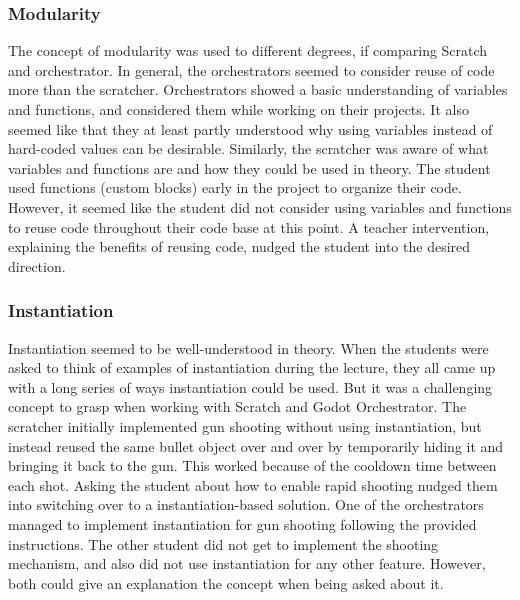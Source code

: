 \subsubsection{Modularity}
The concept of modularity was used to different degrees, if comparing Scratch and orchestrator.
In general, the orchestrators seemed to consider reuse of code more than the scratcher.
Orchestrators showed a basic understanding of variables and functions, and considered them while working on their projects.
It also seemed like that they at least partly understood why using variables instead of hard-coded values can be desirable.
Similarly, the scratcher was aware of what variables and functions are and how they could be used in theory.
The student used functions (custom blocks) early in the project to organize their code.
However, it seemed like the student did not consider using variables and functions to reuse code throughout their code base at this point.
A teacher intervention, explaining the benefits of reusing code, nudged the student into the desired direction.

\subsubsection{Instantiation}
Instantiation seemed to be well-understood in theory.
When the students were asked to think of examples of instantiation during the lecture, they all came up with a long series of ways instantiation could be used.
But it was a challenging concept to grasp when working
with Scratch and Godot Orchestrator.
The scratcher initially implemented gun shooting without using instantiation, but instead reused the same bullet object over and over by temporarily hiding it and bringing it back to the gun.
This worked because of the cooldown time between each shot.
Asking the student about how to enable rapid shooting nudged them into switching over to a instantiation-based solution.
One of the orchestrators managed to implement instantiation for gun shooting following the provided instructions.
The other student did not get to implement the shooting mechanism, and also did not use instantiation for any other feature.
However, both could give an explanation the concept when being asked about it.

